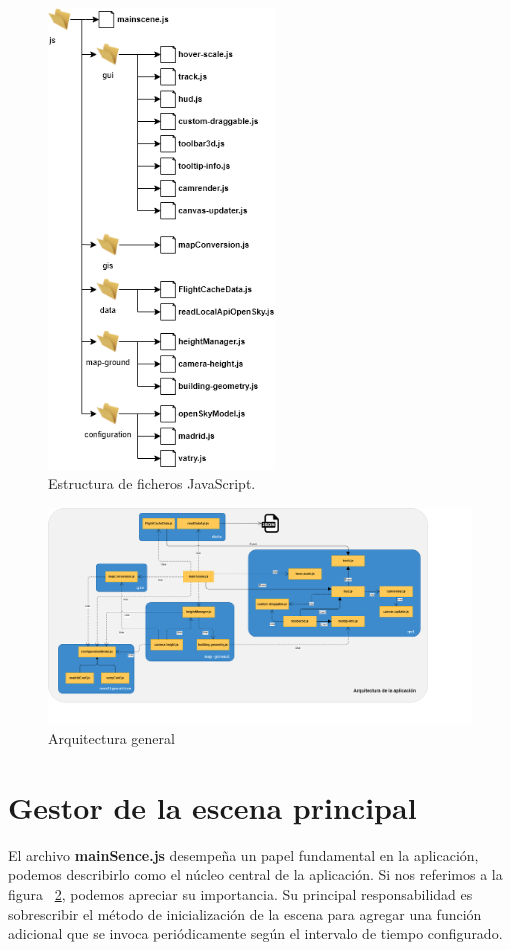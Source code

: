 \documentclass[a4paper, 11pt]{book}
\begin{document}
\begin{figure}[H]
  \centering
  \includegraphics[width=6cm, keepaspectratio]{img/ficheros.drawio.png}
  \caption{Estructura de ficheros JavaScript.}
  \label{fig:javascriptFiles}
\end{figure}

\begin{center}
\begin{figure}[H]
  \centering
  \includegraphics[width=18cm, keepaspectratio]{img/Arquitectura.png}
  \caption{Arquitectura general}
  \label{fig:arquitectura}
\end{figure}
\end{center}
\section{Gestor de la escena principal}
\label{sec:mainScene.js}
El archivo \textbf{mainSence.js} desempeña un papel fundamental en la aplicación, podemos describirlo como el núcleo central de la aplicación. Si nos referimos a la figura ~\ref{fig:arquitectura}, podemos apreciar su importancia. Su principal responsabilidad es sobrescribir el método de inicialización de la escena para agregar una función adicional que se invoca periódicamente según el intervalo de tiempo configurado.
\end{document}
